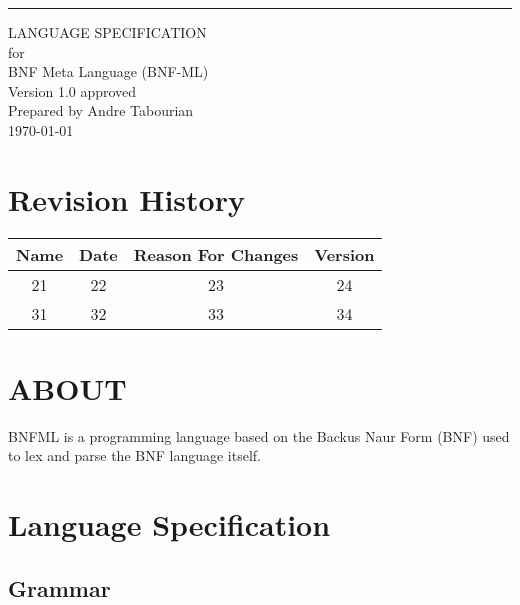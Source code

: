 \documentclass{scrreprt}
\date{}
\def\myversion{1.0 }
\begin{document}
\begin{flushright}
    \rule{16cm}{5pt}\vskip1cm
    \begin{bfseries}
        \Huge{LANGUAGE SPECIFICATION}\\
        \vspace{1.9cm}
        for\\
        \vspace{1.9cm}
        BNF Meta Language (BNF-ML)\\
        \vspace{1.9cm}
        \LARGE{Version \myversion approved}\\
        \vspace{1.9cm}
        Prepared by Andre Tabourian\\
        \vspace{1.9cm}
        \today\\
    \end{bfseries}
\end{flushright}

\tableofcontents


\chapter*{Revision History}

\begin{center}
    \begin{tabular}{|c|c|c|c|}
        \hline
	    Name & Date & Reason For Changes & Version\\
        \hline
	    21 & 22 & 23 & 24\\
        \hline
	    31 & 32 & 33 & 34\\
        \hline
    \end{tabular}
\end{center}

\chapter{ABOUT}

BNFML is a programming language based on the Backus Naur Form (BNF) used to lex and parse the BNF language itself.

\chapter{Language Specification}

\section{Grammar}
\end{document}
